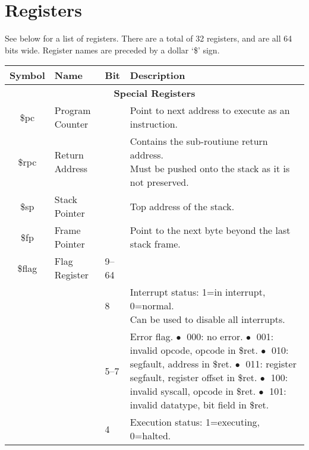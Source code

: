 \documentclass[10pt]{article}
\begin{document}
    \section{Registers}\label{sec:registers}

    See below for a list of registers.
    There are a total of 32 registers, and are all 64 bits wide.
    Register names are preceded by a dollar `\$' sign.

    \bigskip
    \begin{longtable}{|c|l|l|l|}
        \hline
        \textbf{Symbol} & \textbf{Name} & \textbf{Bit} & \textbf{Description} \\
        \hline
        \multicolumn{4}{|c|}{\textbf{Special Registers}} \\
        \hline
        \$pc & Program Counter &  & Point to next address to execute as an instruction. \\
        \hline
        \$rpc & Return Address &  & \makecell[l]{Contains the sub-routiune return address.\\%
        Must be pushed onto the stack as it is not preserved.} \\
        \hline
        \$sp & Stack Pointer &  & Top address of the stack. \\
        \hline
        \$fp & Frame Pointer &  & Point to the next byte beyond the last stack frame. \\
        \hline
        \$flag & Flag Register & 9--64 & \\
        \cline{3-4}
        & & 8 & \makecell[l]{Interrupt status: 1=in interrupt, 0=normal.\\%
        Can be used to disable all interrupts.} \\
        \cline{3-4}
        & & 5--7 & \makecell[l]{Error flag.\\%
        \(\bullet\;\) 000: no error.\\%
        \(\bullet\;\) 001: invalid opcode, opcode in \$ret.\\%
        \(\bullet\;\) 010: segfault, address in \$ret.\\%
        \(\bullet\;\) 011: register segfault, register offset in \$ret.\\%
        \(\bullet\;\) 100: invalid syscall, opcode in \$ret.\\%
        \(\bullet\;\) 101: invalid datatype, bit field in \$ret.\\%
        } \\
        \cline{3-4}
        & & 4 & \makecell[l]{Execution status: 1=executing, 0=halted.\\%
}
\end{longtable}
\end{document}
